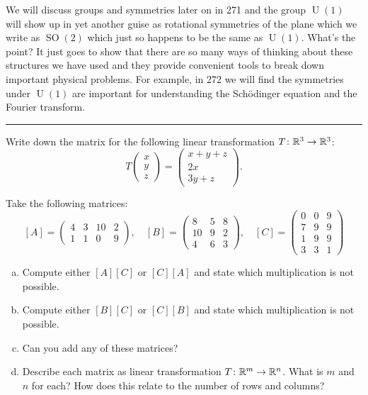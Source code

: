 \documentclass[12pt]{article} %
\begin{document}
\begin{problem}
We will discuss groups and symmetries later on in 271 and the group $\operatorname{U}(1)$ will show up in yet another guise as rotational symmetries of the plane which we write as $\operatorname{SO}(2)$ which just so happens to be the same as $\operatorname{U}(1)$.  What's the point? It just goes to show that there are so many ways of thinking about these structures we have used and they provide convenient tools to break down important physical problems. For example, in 272 we will find the symmetries under $\operatorname{U}(1)$ are important for understanding the Sch\"odinger equation and the Fourier transform. 
\vspace*{5pt}
\hrule
\end{problem}


\begin{problem}
Write down the matrix for the following linear transformation $T\colon \mathbb{R}^3 \to \mathbb{R}^3$:
\[
T\begin{pmatrix} x\\ y\\ z \end{pmatrix}
= \begin{pmatrix} x+y+z\\ 2x\\ 3y + z \end{pmatrix}.
\]
\end{problem}


\begin{problem}
    Take the following matrices:
    \[
        [A] = \begin{pmatrix} 4 & 3 & 10 & 2 \\ 1 & 1 & 0 & 9 \end{pmatrix},\quad [B] = \begin{pmatrix} 8 & 5 & 8 \\ 10 & 9 & 2 \\ 4 & 6 &3 \end{pmatrix}, \quad [C] = \begin{pmatrix} 0 & 0 & 9 \\ 7 & 9 & 9 \\ 1 & 9 & 9 \\ 3 & 3 & 1\end{pmatrix}
    \]
    \begin{enumerate}[(a)]
        \item Compute either $[A][C]$ or $[C][A]$ and state which multiplication is not possible.
        \item Compute either $[B][C]$ or $[C][B]$ and state which multiplication is not possible.
        \item Can you add any of these matrices?
        \item Describe each matrix as linear transformation $T\colon \mathbb{R}^m \to \mathbb{R}^n$. What is $m$ and $n$ for each? How does this relate to the number of rows and columns?
    \end{enumerate}
\end{problem}
\end{document}
